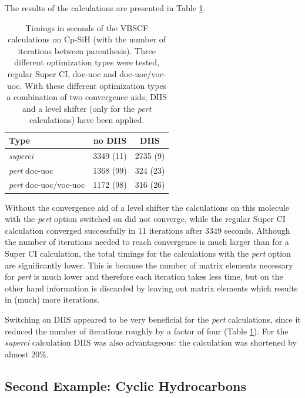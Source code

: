 The results of the calculations are presented in Table \ref{ch2.tab.budzelaar}.
\begin{table}[htdp]
\caption{Timings in seconds of the VBSCF calculations on Cp-SiH (with the number of iterations between parenthesis). Three different optimization types were tested, regular Super CI, doc-uoc and doc-uoc/voc-uoc. With these different optimization types a combination of two convergence aids, DIIS and a level shifter (only for the \textit{pert} calculations) have been applied.}
\begin{center}
\begin{tabular}{l c c}
\hline
Type & no DIIS & DIIS \\
\hline
\textit{superci} & 3349 (11) & 2735 (9) \\ 
\textit{pert} doc-uoc & 1368 (99) & 324 (23)\\ 
\textit{pert} doc-uoc/voc-uoc & 1172 (98) & 316 (26)\\
\end{tabular}
\label{ch2.tab.budzelaar}
\end{center}
\end{table}
Without the convergence aid of a level shifter the calculations on this molecule with the \textit{pert} option switched on did not converge, while the regular Super CI calculation converged successfully in 11 iterations after 3349 seconds. Although the number of iterations needed to reach convergence is much larger than for a Super CI calculation, the total timings for the calculations with the \textit{pert} option are significantly lower. This is because the number of matrix elements necessary for \textit{pert} is much lower and therefore each iteration takes less time, but on the other hand information is discarded by leaving out matrix elements which results in (much) more iterations. 

Switching on DIIS appeared to be very beneficial for the \textit{pert} calculations, since it reduced the number of iterations roughly by a factor of four (Table \ref{ch2.tab.budzelaar}). For the \textit{superci} calculation DIIS was also advantageous: the calculation was shortened by almost 20\%.

\subsection{\label{ch2.sec.aromat}Second Example: Cyclic Hydrocarbons}

